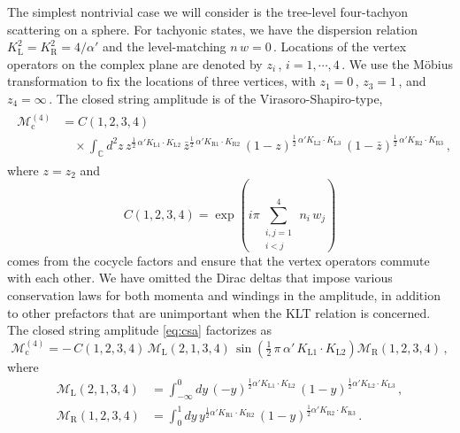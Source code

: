 \documentclass[11pt]{article}
\newcommand{\be}{\begin{equation}}
\newcommand{\ee}{\end{equation}}
\newcommand{\CM}{\mathcal{M}}
\newcommand{\lr}{\left (}
\newcommand{\rr}{\right )}
\begin{document}
The simplest nontrivial case we will consider is the tree-level four-tachyon scattering on a sphere. For tachyonic states, we have the dispersion relation $K_\text{L}^2 = K_\text{R}^2 = 4 / \alpha'$ and the level-matching  $n \, w = 0$\,. Locations of the vertex operators on the complex plane are denoted by $z_i$\,, $i = 1, \cdots, 4$\,. We use the M\"{o}bius transformation to fix the locations of three vertices, with $z_1 = 0$\,, $z_3 = 1$\,, and $z_4 = \infty$\,. The closed string amplitude is of the Virasoro-Shapiro-type, 
%
\begin{align} \label{eq:csa}
\begin{split}
    {\CM}^{(4)}_\text{c} & = {C}(1,2,3,4) \\[2pt]
    & \quad \times \int_\mathbb{C} d^2 z \, z^{\frac{1}{2} \, {\alpha}{}' K_{\text{L}1} \cdot K_{\text{L}2}} \, \bar{z}^{\frac{1}{2} \, {\alpha}{}' K_{\text{R}1} \cdot K_{\text{R}2}} \, (1-z)^{\frac{1}{2} \, {\alpha}{}' K_{\text{L}2} \cdot K_{\text{L}3}} \, (1-\bar{z})^{\frac{1}{2} \, {\alpha}{}' K_{\text{R}2} \cdot K_{\text{R}3}}\,,
\end{split}
\end{align}
%
where $z = z_2$ and
%
\be
    {C}(1,2,3,4) = \exp \! \lr i \pi {\sum}_{\substack{i,j=1\\i<j}}^4 \, n_i \, w_j \rr
\ee
%
comes from the cocycle factors and ensure that the vertex operators commute with each other. We have omitted the Dirac deltas that impose various conservation laws for both momenta and windings in the amplitude, in addition to other prefactors that are unimportant when the KLT relation is concerned. The closed string amplitude \eqref{eq:csa} factorizes as \cite{Gomis:2021ire}
%
\be \label{eq:kltws}
    {\CM}^{(4)}_\text{c} = - \, {C}(1,2,3,4) \, {\CM}_\text{L} (2,1,3,4) \, \sin \lr \tfrac{1}{2} \, \pi \, {\alpha}{}' \, K_{\text{L}1} \cdot K_{\text{L}2} \rr {\CM}_\text{R} (1,2,3,4)\,,
\ee
%
where
%
\begin{subequations} \label{eq:mlr}
\begin{align}
    \CM_\text{L} (2,1,3,4) & = \int_{-\infty}^0 dy \, (-y)^{\frac{1}{2} {\alpha}{}' K_{\text{L}1} \cdot K_{\text{L}2}} \, (1-y)^{\frac{1}{2} {\alpha}{}' K_{\text{L}2} \cdot K_{\text{L}3}}\,, \label{eq:ml} \\[2pt]
    \CM_\text{R} (1,2,3,4) & = \int_0^1 dy \, y^{\frac{1}{2} {\alpha}{}' K_{\text{R}1} \cdot K_{\text{R}2}} \, (1-y)^{\frac{1}{2} {\alpha}{}' K_{\text{R}2} \cdot K_{\text{R}3}}\,. \label{eq:mr}
\end{align}
\end{subequations}
\end{document}
